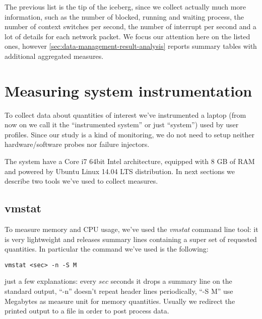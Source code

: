\documentclass[10pt,a4paper]{article}
\begin{document}
    The previous list is the tip of the iceberg, since we collect
    actually much more information, such as the number of blocked,
    running and waiting process, the number of context switches per
    second, the number of interrupt per second and a lot of details
    for each network packet. We focus our attention here on the listed
    ones, however \autoref{sec:data-management-result-analysis}
    reports summary tables with additional aggregated measures.



    \section{Measuring system instrumentation}
    To collect data about quantities of interest we've instrumented a
    laptop (from now on we call it the ``instrumented system'' or just
    ``system'') used by user profiles. Since our study is a kind of
    monitoring, we do not need to setup neither hardware/software
    probes nor failure injectors.

    The system have a Core i7 64bit Intel architecture, equipped with
    8 GB of RAM and powered by Ubuntu Linux 14.04 LTS distribution. In
    next sections we describe two tools we've used to collect
    measures.

    \subsection{vmstat} 
    To measure memory and CPU usage, we've used the \emph{vmstat}
    \cite{vmstat} command line tool: it is very lightweight and
    releases summary lines containing a super set of requested
    quantities. In particular the command we've used is the following:
\begin{verbatim}
vmstat <sec> -n -S M 
\end{verbatim}
    just a few explanations: every $sec$ seconds it drops a summary
    line on the standard output, ``-n'' doesn't repeat header lines
    periodically, ``-S M'' use Megabytes as measure unit for memory
    quantities. Usually we redirect the printed output to a file in
    order to post process data.
\end{document}
